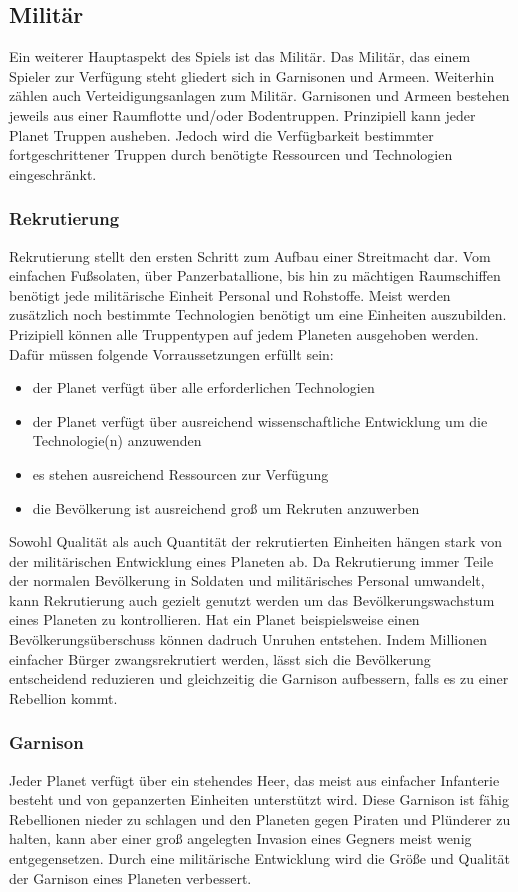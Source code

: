 \documentclass[11pt, a4paper]{article}
\begin{document}
\subsection{Militär}
Ein weiterer Hauptaspekt des Spiels ist das Militär. Das Militär, das einem Spieler zur Verfügung steht
gliedert sich in Garnisonen und Armeen. Weiterhin zählen auch Verteidigungsanlagen zum Militär.
Garnisonen und Armeen bestehen jeweils aus einer Raumflotte und/oder Bodentruppen. Prinzipiell kann jeder
Planet Truppen ausheben. Jedoch wird die Verfügbarkeit bestimmter fortgeschrittener Truppen durch benötigte
Ressourcen und Technologien eingeschränkt.
%
\subsubsection{Rekrutierung}
Rekrutierung stellt den ersten Schritt zum Aufbau einer Streitmacht dar. Vom einfachen Fußsolaten, über
Panzerbatallione, bis hin zu mächtigen Raumschiffen benötigt jede militärische Einheit Personal und Rohstoffe.
Meist werden zusätzlich noch bestimmte Technologien benötigt um eine Einheiten auszubilden. Prizipiell können
alle Truppentypen auf jedem Planeten ausgehoben werden. Dafür müssen folgende Vorraussetzungen erfüllt sein:
\begin{itemize}
    \item der Planet verfügt über alle erforderlichen Technologien
    \item der Planet verfügt über ausreichend wissenschaftliche Entwicklung um die Technologie(n) anzuwenden
    \item es stehen ausreichend Ressourcen zur Verfügung
    \item die Bevölkerung ist ausreichend groß um Rekruten anzuwerben
\end{itemize}
%
Sowohl Qualität als auch Quantität der rekrutierten Einheiten hängen stark von der militärischen Entwicklung
eines Planeten ab. Da Rekrutierung immer Teile der normalen Bevölkerung in Soldaten und militärisches Personal
umwandelt, kann Rekrutierung auch gezielt genutzt werden um das Bevölkerungswachstum eines Planeten zu
kontrollieren. Hat ein Planet beispielsweise einen Bevölkerungsüberschuss können dadruch Unruhen entstehen.
Indem Millionen einfacher Bürger zwangsrekrutiert werden, lässt sich die Bevölkerung entscheidend reduzieren
und gleichzeitig die Garnison aufbessern, falls es zu einer Rebellion kommt.
%
\subsubsection{Garnison}
Jeder Planet verfügt über ein stehendes Heer, das meist aus einfacher Infanterie besteht und von gepanzerten
Einheiten unterstützt wird. Diese Garnison ist fähig Rebellionen nieder zu schlagen und den Planeten gegen
Piraten und Plünderer zu halten, kann aber einer groß angelegten Invasion eines Gegners meist wenig
entgegensetzen. Durch eine militärische Entwicklung wird die Größe und Qualität der Garnison eines Planeten
verbessert.
%
\end{document}
